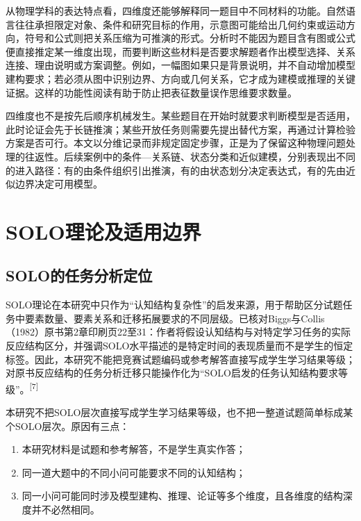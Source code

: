 \documentclass[
  12pt,
  a4paper]{ctexbook}
\providecommand{\tightlist}{%
  \setlength{\itemsep}{0pt}\setlength{\parskip}{0pt}}
\begin{document}
从物理学科的表达特点看，四维度还能够解释同一题目中不同材料的功能。自然语言往往承担限定对象、条件和研究目标的作用，示意图可能给出几何约束或运动方向，符号和公式则把关系压缩为可推演的形式。分析时不能因为题目含有图或公式便直接推定某一维度出现，而要判断这些材料是否要求解题者作出模型选择、关系连接、理由说明或方案调整。例如，一幅图如果只是背景说明，并不自动增加模型建构要求；若必须从图中识别边界、方向或几何关系，它才成为建模或推理的关键证据。这样的功能性阅读有助于防止把表征数量误作思维要求数量。

四维度也不是按先后顺序机械发生。某些题目在开始时就要求判断模型是否适用，此时论证会先于长链推演；某些开放任务则需要先提出替代方案，再通过计算检验方案是否可行。本文以分维记录而非规定固定步骤，正是为了保留这种物理问题处理的往返性。后续案例中的条件---关系链、状态分类和近似建模，分别表现出不同的进入路径：有的由条件组织引出推演，有的由状态划分决定表达式，有的先由近似边界决定可用模型。

\section{SOLO理论及适用边界}\label{soloux7406ux8bbaux53caux9002ux7528ux8fb9ux754c}

\subsection{SOLO的任务分析定位}\label{soloux7684ux4efbux52a1ux5206ux6790ux5b9aux4f4d}

SOLO理论在本研究中只作为``认知结构复杂性''的启发来源，用于帮助区分试题任务中要素数量、要素关系和迁移拓展要求的不同层级。已核对Biggs与Collis（1982）原书第2章印刷页22至31：作者将假设认知结构与对特定学习任务的实际反应结构区分，并强调SOLO水平描述的是特定时间的表现质量而不是学生的恒定标签。因此，本研究不能把竞赛试题编码或参考解答直接写成学生学习结果等级；对原书反应结构的任务分析迁移只能操作化为``SOLO启发的任务认知结构要求等级''。\textsuperscript{[7]}

本研究不把SOLO层次直接写成学生学习结果等级，也不把一整道试题简单标成某个SOLO层次。原因有三点：

\begin{enumerate}
\def\labelenumi{\arabic{enumi}.}
\tightlist
\item
  本研究材料是试题和参考解答，不是学生真实作答；
\item
  同一道大题中的不同小问可能要求不同的认知结构；
\item
  同一小问可能同时涉及模型建构、推理、论证等多个维度，且各维度的结构深度并不必然相同。
\end{enumerate}
\end{document}
